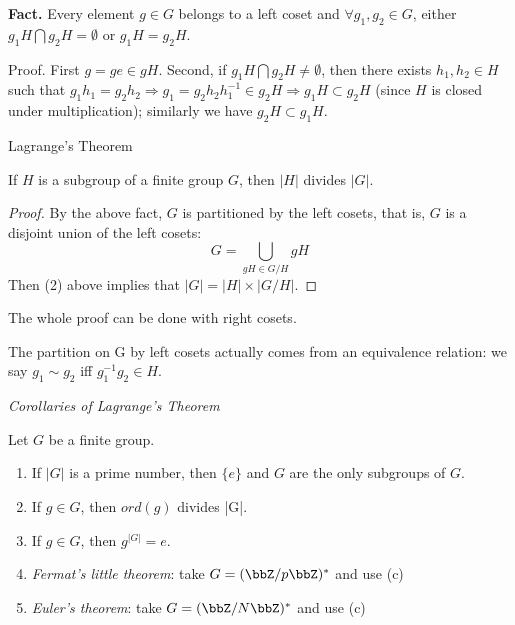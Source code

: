 \textbf{Fact.} Every element $g\in G$ belongs to a left coset and $\forall g_1,g_2 \in G$, either $g_1 H \bigcap g_2H =\emptyset$ or $g_1 H =g_2 H$.

Proof. First $g =ge\in gH$. Second, if $g_1 H \bigcap g _2 H\neq\emptyset$, then there exists $h_1,h_2\in H$ such that $g_1h_1=g_2h_2\Rightarrow g_1=g_2h_2h_1^{-1}\in g_2H\Rightarrow g_1H\subset g_2H$ (since $H$ is closed under multiplication); similarly we have $g_2 H \subset g_1 H$.


\begin{theorem}
    Lagrange's Theorem

    If $H$ is a subgroup of a finite group $G$, then $|H|$ divides $|G|$.  
\end{theorem}

\begin{proof}
    By the above fact, $G$ is partitioned by the left cosets, that is, $G$ is a disjoint union of the left cosets: 
    $$    G=\bigcup_{g H \in G / H} g H    $$
    Then (2) above implies that $|G|=|H| \times|G / H|$.
\end{proof}

\begin{remark}
    The whole proof can be done with right cosets.

    The partition on G by left cosets actually comes from an equivalence relation: we say 
     $g_1 \sim g_2$ iff $g_1^{-1}g_2 \in H$.
\end{remark}

\begin{lemma}
    \emph{Corollaries of Lagrange's Theorem}

    Let $G$ be a finite group. 
    \begin{enumerate}
        \item If $|G|$ is a prime number, then $\{e\}$ and $G$ are the only subgroups of $G$.
        \item If $g \in G$, then $ord(g)$ divides |G|.
        \item If $g \in G$, then $g^{|G|}=e$.
        \item \emph{Fermat's little theorem}: take $G = (\bbZ/p\bbZ)^*$ and use (c)
        \item \emph{Euler's theorem}: take $G = (\bbZ/N\bbZ)^*$ and use (c)
    \end{enumerate}
\end{lemma}
